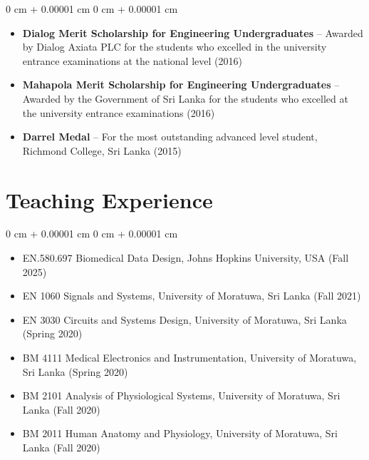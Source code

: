 \documentclass[10pt, letterpaper]{article}
\newenvironment{highlights}{
    \begin{itemize}[
        topsep=0.10 cm,
        parsep=0.10 cm,
        partopsep=0pt,
        itemsep=0pt,
        leftmargin=0 cm + 10pt
    ]
}{
    \end{itemize}
} %
\newenvironment{onecolentry}{
    \begin{adjustwidth}{
        0 cm + 0.00001 cm
    }{
        0 cm + 0.00001 cm
    }
}{
    \end{adjustwidth}
} %
\begin{document}
\begin{onecolentry}
\begin{highlights}
            \item \textbf{Dialog Merit Scholarship for Engineering Undergraduates} -- Awarded by Dialog Axiata PLC for the students who excelled in the university entrance examinations at the national level (2016)
            \item \textbf{Mahapola Merit Scholarship for Engineering Undergraduates} -- Awarded by the Government of Sri Lanka for the students who excelled at the university entrance examinations (2016)
            \item \textbf{Darrel Medal} -- For the most outstanding advanced level student, Richmond College, Sri Lanka (2015)
        \end{highlights}
    \end{onecolentry}


    \section{Teaching Experience}

    \begin{onecolentry}
        \begin{highlights}
            \item EN.580.697 Biomedical Data Design, Johns Hopkins University, USA (Fall 2025)
            \item EN 1060 Signals and Systems, University of Moratuwa, Sri Lanka (Fall 2021)
            \item EN 3030 Circuits and Systems Design, University of Moratuwa, Sri Lanka (Spring 2020)
            \item BM 4111 Medical Electronics and Instrumentation, University of Moratuwa, Sri Lanka (Spring 2020)
            \item BM 2101 Analysis of Physiological Systems, University of Moratuwa, Sri Lanka (Fall 2020)
            \item BM 2011 Human Anatomy and Physiology, University of Moratuwa, Sri Lanka (Fall 2020)
        \end{highlights}
    \end{onecolentry}
\end{document}
